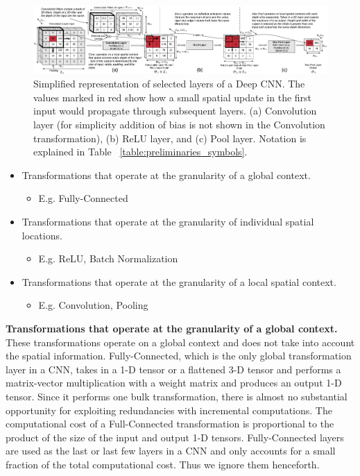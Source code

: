 \begin{figure}[t]
\includegraphics[width=\textwidth]{images/cnn_simplified}
\caption{Simplified representation of selected layers of a Deep CNN. The values marked in red show how a small spatial update in the first input would propagate through subsequent layers. (a) Convolution layer (for simplicity addition of bias is not shown in the Convolution transformation), (b) ReLU layer, and (c) Pool layer. Notation is explained in Table ~\ref{table:preliminaries_symbols}.}
\label{fig:cnn_simplified}
\end{figure}

\begin{itemize}
    \item Transformations that operate at the granularity of a global context.
    \begin{itemize}
     \item E.g. Fully-Connected
    \end{itemize}
	\item Transformations that operate at the granularity of individual  spatial locations.
	\begin{itemize}
	 \item E.g. ReLU, Batch Normalization
	\end{itemize}
	\item Transformations that operate at the granularity of a local spatial context.
	\begin{itemize}
	 \item E.g. Convolution, Pooling
	\end{itemize}
\end{itemize}

\vspace{2mm}
\noindent \textbf{Transformations that operate at the granularity of a global context.} These transformations operate on a global context and does not take into account the spatial information.
Fully-Connected, which is the only global transformation layer in a CNN, takes in a 1-D tensor or a flattened 3-D tensor and performs a matrix-vector multiplication with a weight matrix and produces an output 1-D tensor.
Since it performs one bulk transformation, there is almost no substantial opportunity for exploiting redundancies with incremental computations.
The computational cost of a Full-Connected transformation is proportional to the product of the size of the input and output 1-D tensors.
Fully-Connected layers are used as the last or last few layers in a CNN and only accounts for a small fraction of the total computational cost.
Thus we ignore them henceforth.

